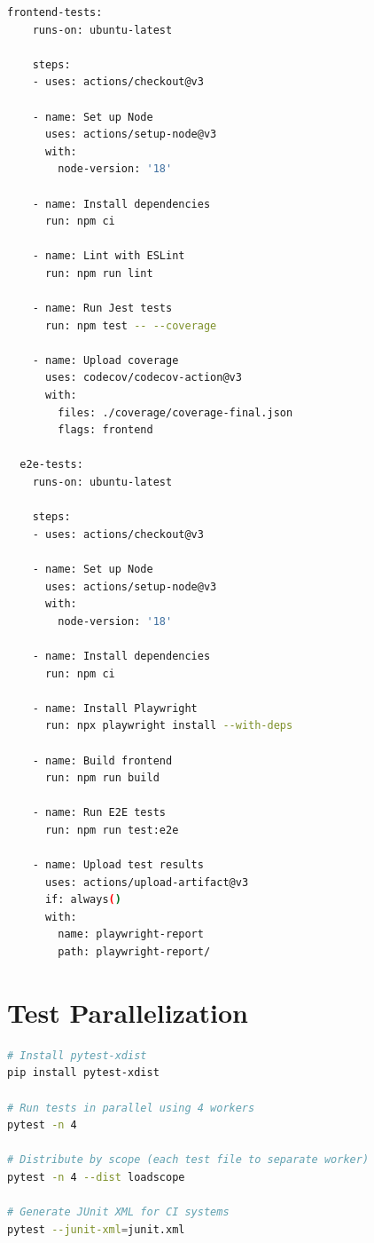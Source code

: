 \documentclass{report}
\begin{document}
\begin{lstlisting}[language=bash, caption=GitHub Actions CI pipeline configuration]
  frontend-tests:
    runs-on: ubuntu-latest
    
    steps:
    - uses: actions/checkout@v3
    
    - name: Set up Node
      uses: actions/setup-node@v3
      with:
        node-version: '18'
    
    - name: Install dependencies
      run: npm ci
    
    - name: Lint with ESLint
      run: npm run lint
    
    - name: Run Jest tests
      run: npm test -- --coverage
    
    - name: Upload coverage
      uses: codecov/codecov-action@v3
      with:
        files: ./coverage/coverage-final.json
        flags: frontend

  e2e-tests:
    runs-on: ubuntu-latest
    
    steps:
    - uses: actions/checkout@v3
    
    - name: Set up Node
      uses: actions/setup-node@v3
      with:
        node-version: '18'
    
    - name: Install dependencies
      run: npm ci
    
    - name: Install Playwright
      run: npx playwright install --with-deps
    
    - name: Build frontend
      run: npm run build
    
    - name: Run E2E tests
      run: npm run test:e2e
    
    - name: Upload test results
      uses: actions/upload-artifact@v3
      if: always()
      with:
        name: playwright-report
        path: playwright-report/
\end{lstlisting}

\section{Test Parallelization}

\begin{lstlisting}[language=bash, caption=Running tests in parallel with pytest-xdist]
# Install pytest-xdist
pip install pytest-xdist

# Run tests in parallel using 4 workers
pytest -n 4

# Distribute by scope (each test file to separate worker)
pytest -n 4 --dist loadscope

# Generate JUnit XML for CI systems
pytest --junit-xml=junit.xml
\end{lstlisting}
\end{document}
